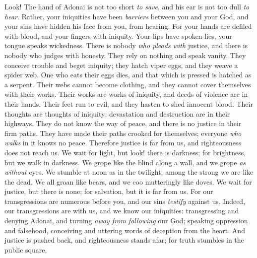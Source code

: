 \begin{biblechapter} %
 Look! The hand of Adonai is not too short \textit{to save}, 
and his ear is not too dull \textit{to hear}.
\verse Rather, your iniquities have been \textit{barriers} between you and your God, 
and your sins have hidden his face from you, from hearing.
\verse For your hands are defiled with blood, 
and your fingers with iniquity. 
Your lips have spoken lies, 
your tongue speaks wickedness.
\verse There is nobody \textit{who pleads with} justice, 
and there is nobody who judges with honesty. 
They rely on nothing 
and speak vanity. 
They conceive trouble 
and beget iniquity;
\verse they hatch viper eggs, 
and they weave a spider web. 
One who eats their eggs dies, 
and that which is pressed is hatched as a serpent.
\verse Their webs cannot become clothing, 
and they cannot cover themselves with their works. 
Their works are works of iniquity, 
and deeds of violence are in their hands.
\verse Their feet run to evil, 
and they hasten to shed innocent blood. 
Their thoughts are thoughts of iniquity; 
devastation and destruction are in their highways.
\verse They do not know the way of peace, 
and there is no justice in their firm paths. 
They have made their paths crooked for themselves; 
everyone \textit{who walks} in it knows no peace.
\verse Therefore justice is far from us, 
and righteousness does not reach us. 
We wait for light, but look! there is darkness; 
for brightness, but we walk in darkness.
\verse We grope like the blind along a wall, 
and we grope \textit{as without} eyes. 
We stumble at noon as in the twilight; 
among the strong we are like the dead.
\verse We all groan like bears, 
and we coo mutteringly like doves. 
We wait for justice, but there is none; 
for salvation, but it is far from us.
\verse For our transgressions are numerous before you, 
and our sins \textit{testify} against us. 
Indeed, our transgressions are with us, 
and we know our iniquities:
\verse transgressing and denying Adonai, 
and turning \textit{away from following} our God; 
speaking oppression and falsehood, 
conceiving and uttering words of deception from the heart.
\verse And justice is pushed back, 
and righteousness stands afar; 
for truth stumbles in the public square, 

\end{biblechapter}
